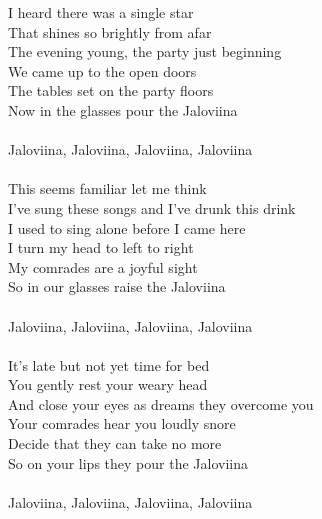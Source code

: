 
            I heard there was a single star \\
            That shines so brightly from afar \\
            The evening young, the party just beginning \\
            We came up to the open doors \\
            The tables set on the party floors \\
            Now in the glasses pour the Jaloviina \\
\hspace{10mm} \\
            Jaloviina, Jaloviina, Jaloviina, Jaloviina \\
\hspace{10mm} \\
            This seems familiar let me think \\
            I've sung these songs and I've drunk this drink \\
            I used to sing alone before I came here \\
            I turn my head to left to right  \\
            My comrades are a joyful sight \\
            So in our glasses raise the Jaloviina \\
\hspace{10mm} \\
            Jaloviina, Jaloviina, Jaloviina, Jaloviina \\
\hspace{10mm} \\
            It's late but not yet time for bed \\
            You gently rest your weary head \\
            And close your eyes as dreams they overcome you \\
            Your comrades hear you loudly snore \\
            Decide that they can take no more \\
            So on your lips they pour the Jaloviina \\
\hspace{10mm} \\
            Jaloviina, Jaloviina, Jaloviina, Jaloviina \\
